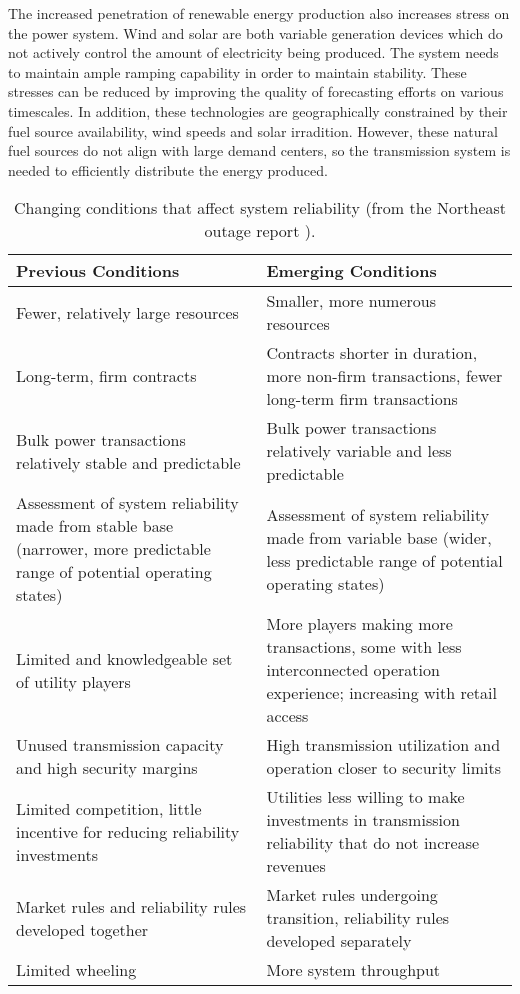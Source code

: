 The increased penetration of renewable energy production also increases stress on the power system.  Wind and solar are both variable generation devices which do not actively control the amount of electricity being produced.  The system needs to maintain ample ramping capability in order to maintain stability.  These stresses can be reduced by improving the quality of forecasting efforts on various timescales.  In addition, these technologies are geographically constrained by their fuel source availability, wind speeds and solar irradition.  However, these natural fuel sources do not align with large demand centers, so the transmission system is needed to efficiently distribute the energy produced.

\begin{table}
\centering
\footnotesize
\begin{tabular}{| p{7cm} | p{7cm} |}
\hline
\bf Previous Conditions 	&	\bf Emerging Conditions 		\\	\hline  	\hline
Fewer, relatively large resources	&	Smaller, more numerous resources		\\	\hline
Long-term, firm contracts 	&	Contracts shorter in duration, more non-firm transactions, fewer long-term firm transactions	\\	\hline
Bulk power transactions relatively stable and predictable	&	Bulk power transactions relatively variable and less predictable	\\	\hline
Assessment of system reliability made from stable base (narrower, more predictable range of potential operating states)	&	Assessment of system reliability made from variable base (wider, less predictable range of potential operating states)		\\		\hline
Limited and knowledgeable set of utility players 	&	More players making more transactions, some with less interconnected operation experience; increasing with retail access	\\	\hline
Unused transmission capacity and high security margins	&	High transmission utilization and operation closer to security limits	\\	\hline
Limited competition, little incentive for reducing reliability investments	&	Utilities less willing to make investments in transmission reliability that do not increase revenues	\\	\hline
Market rules and reliability rules developed together	&	Market rules undergoing transition, reliability rules developed separately	\\	\hline
Limited wheeling	&	More system throughput	\\	\hline
\end{tabular}
\caption{\small Changing conditions that affect system reliability (from the Northeast outage report \cite{northeast_2003}).}
 \label{tab:change1}
\end{table}


